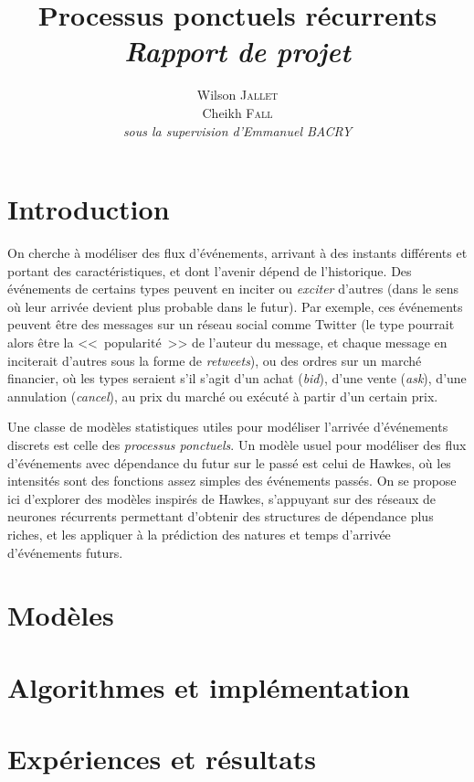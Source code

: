 \documentclass[11pt]{article}
\title{\textbf{Processus ponctuels récurrents}\\
	\textit{Rapport de projet}  
}
\author{
  Wilson \textsc{Jallet}\\
  Cheikh \textsc{Fall}\\
  \textit{sous la supervision d'Emmanuel BACRY}
}
\begin{document}
\maketitle

\section{Introduction}

On cherche à modéliser des flux d'événements, arrivant à des instants différents et portant des caractéristiques, et dont l'avenir dépend de l'historique. Des événements de certains types peuvent en inciter ou \textit{exciter} d'autres (dans le sens où leur arrivée devient plus probable dans le futur). Par exemple, ces événements peuvent être des messages sur un réseau social comme Twitter (le type pourrait alors être la <<~popularité~>> de l'auteur du message, et chaque message en inciterait d'autres sous la forme de \textit{retweets}), ou des ordres sur un marché financier, où les types seraient s'il s'agit d'un achat (\textit{bid}), d'une vente (\textit{ask}), d'une annulation (\textit{cancel}), au prix du marché ou exécuté à partir d'un certain prix.

Une classe de modèles statistiques utiles pour modéliser l'arrivée d'événements discrets est celle des \textit{processus ponctuels}. Un modèle usuel pour modéliser des flux d'événements avec dépendance du futur sur le passé est celui de Hawkes, où les intensités sont des fonctions assez simples des événements passés. On se propose ici d'explorer des modèles inspirés de Hawkes, s'appuyant sur des réseaux de neurones récurrents permettant d'obtenir des structures de dépendance plus riches, et les appliquer à la prédiction des natures et temps d'arrivée d'événements futurs.

\section{Modèles}




\section{Algorithmes et implémentation}



\section{Expériences et résultats}




\printbibliography

\begin{appendices}
	


\end{appendices}
\end{document}
